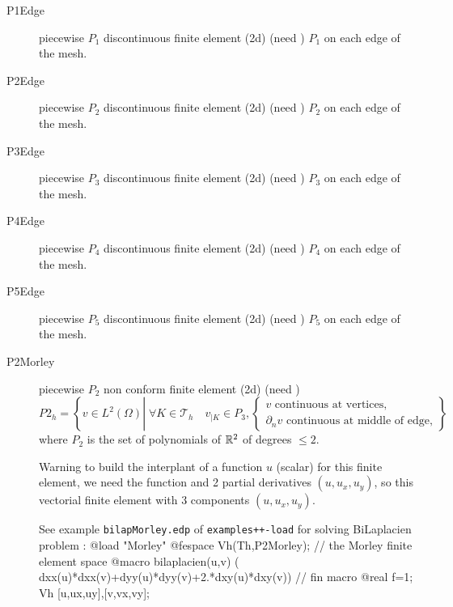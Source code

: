 \documentclass[a4paper,twoside,12pt]{book}
\def\p{\partial}
\begin{document}
\begin{description}
     \item[P1Edge] piecewise $P_{1}$  discontinuous finite element (2d)  (need )  $P_1$ on each edge of the mesh.
     \item[P2Edge] piecewise $P_{2}$  discontinuous finite element (2d)  (need )  $P_2$ on each edge of the mesh.
     \item[P3Edge] piecewise $P_{3}$  discontinuous finite element (2d)  (need )  $P_3$ on each edge of the mesh.
     \item[P4Edge] piecewise $P_{4}$  discontinuous finite element (2d)  (need )  $P_4$ on each edge of the mesh.
    \item[P5Edge] piecewise $P_{5}$  discontinuous finite element (2d)  (need )  $P_5$ on each edge of the mesh.


     \item[P2Morley] piecewise $P_{2}$  non conform finite element (2d)  (need )
     \begin{equation}
     P2_{h} = \left\{ v \in L^2(\Omega) \left|\; \forall K \in \mathcal{T}_{h}
        \quad v_{|K} \in P_{3}, 
        \left\{\begin{array}{c} 
        v \mbox{ continuous  at vertices,}\\
        \p_n{v} \mbox{ continuous  at middle of edge,} 
        \end{array}\right. 
         \right.\right\}
     \end{equation}
     where
     $P_{2}$ is the set of polynomials of $\mathbb{R}^{2}$ of  degrees $\le 2$.

      Warning to build the interplant of a function $u$ (scalar) for this  finite element,
       we need the function and 2 partial derivatives $(u,u_x, u_y)$,
      so  this vectorial finite element with 3 components  $(u,u_x,u_y)$.
      
      See example \texttt{bilapMorley.edp} of \verb!examples++-load! for solving BiLaplacien problem : 
\bFF
         @load "Morley" 
         @fespace Vh(Th,P2Morley);      // the Morley finite element space
         @macro bilaplacien(u,v) ( dxx(u)*dxx(v)+dyy(u)*dyy(v)+2.*dxy(u)*dxy(v)) // fin macro 
         @real f=1;
         Vh [u,ux,uy],[v,vx,vy];


\end{description}
\end{document}
